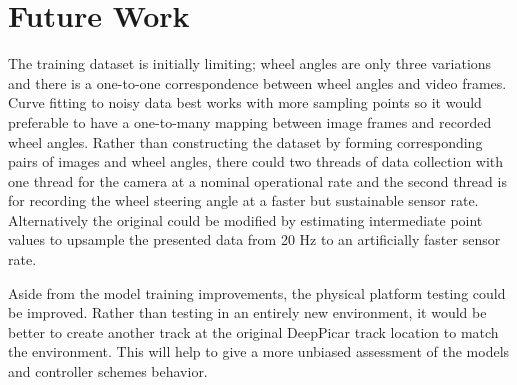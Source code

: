\documentclass[conference]{IEEEtran}
\begin{document}
\section{Future Work}

The training dataset \cite{bechtel2018} is initially limiting; wheel angles are only three variations and there is a one-to-one correspondence between wheel angles and video frames. Curve fitting to noisy data best works with more sampling points so it would preferable to have a one-to-many mapping between image frames and recorded wheel angles. Rather than constructing the dataset by forming corresponding pairs of images and wheel angles, there could two threads of data collection with one thread for the camera at a nominal operational rate and the second thread is for recording the wheel steering angle at a faster but sustainable sensor rate. Alternatively the original \cite{bechtel2018} could be modified by estimating intermediate point values to upsample the presented data from 20 Hz to an artificially faster sensor rate.

Aside from the model training improvements, the physical platform testing could be improved. Rather than testing in an entirely new environment, it would be better to create another track at the original DeepPicar track location to match the environment. This will help to give a more unbiased assessment of the models and controller schemes behavior.



\end{document}

